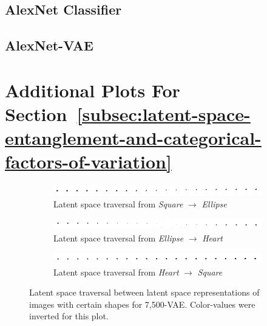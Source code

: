 \documentclass[11pt,a4paper]{article}
\let\oldsection\section
\renewcommand\section{\clearpage\oldsection}
\begin{document}
\subsection{AlexNet Classifier}\label{subseq:appendix_alexnet_classifiers}


\subsection{AlexNet-\ac{VAE}}\label{subseq:appendix_alexnet_vae}



\pagebreak
\section{Additional Plots For Section~\ref{subsec:latent-space-entanglement-and-categorical-factors-of-variation}}\label{sec:additional_plots_latent_space_entanglement}
\begin{figure}[H]
\centering
\begin{subfigure}{\textwidth}
\centering
\includegraphics[width=\textwidth]{images/latent_space_entanglement/vae_7500_traverse_square_ellipse.png}
\caption{Latent space traversal from \textit{Square} $\rightarrow$ \textit{Ellipse}}
\end{subfigure}
\begin{subfigure}{\textwidth}
\centering
\includegraphics[width=\textwidth]{images/latent_space_entanglement/vae_7500_traverse_ellipse_heart.png}
\caption{Latent space traversal from \textit{Ellipse} $\rightarrow$ \textit{Heart}}
\end{subfigure}
\begin{subfigure}{\textwidth}
\centering
\includegraphics[width=\textwidth]{images/latent_space_entanglement/vae_7500_traverse_heart_square.png}
\caption{Latent space traversal from \textit{Heart} $\rightarrow$ \textit{Square}}
\label{subfig:10000_vae_latent_space_traversal_heart_to_square}
\end{subfigure}
\caption[7,500-\ac{VAE} - Latent Space Traversal]{Latent space traversal between latent space representations of images with certain shapes for 7,500-\ac{VAE}. Color-values were inverted for this plot.}
\label{fig:7500_vae_latent_space_traversal_shape_to_shape}
\end{figure}
\end{document}
